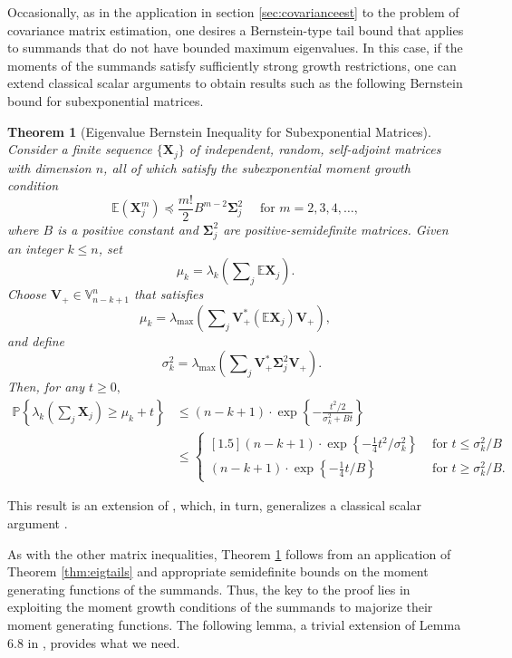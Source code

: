 \documentclass[11pt,letterpaper,twoside,reqno,nosumlimits]{amsart}
\renewcommand{\star}{*}
\newcommand{\mat}[1]{\ensuremath{\bm{#1}}} %
\newcommand{\E}{\ensuremath{\mathbb{E}}}
\newcommand{\Prob}[1]{\ensuremath{\mathbb{P}\left\{#1\right\}}}
\newcommand{\lambdamax}[1]{\ensuremath{\lambda_{\mathrm{max}}\left(#1\right)}}
\newcommand{\Isom}[2]{\ensuremath{\mathbb{V}_{#1}^{#2}}}
\newtheorem{thm}{Theorem}
\theoremstyle{remark}
\numberwithin{equation}{section}
\numberwithin{thm}{section}
\numberwithin{prop}{section}
\numberwithin{defn}{section}
\numberwithin{remark}{section}
\begin{document}
Occasionally, as in the application in section \ref{sec:covarianceest} to the problem of covariance matrix estimation, one desires a Bernstein-type tail bound that applies to summands that do not have bounded maximum eigenvalues. In this case, if the moments of the summands satisfy sufficiently strong growth restrictions, one can extend classical scalar arguments to obtain results such as the following Bernstein bound for subexponential matrices. 

\begin{thm}[Eigenvalue Bernstein Inequality for Subexponential Matrices]
Consider a finite sequence $\{\mat{X}_j\}$ of independent, random, self-adjoint matrices with dimension $n$, all of which satisfy the subexponential moment growth condition
\[
\E (\mat{X}_j^m) \preceq \frac{m!}{2} B^{m-2} \mat{\Sigma}_j^2 \quad \text{ for } m=2,3,4,\ldots,
\]
where $B$ is a positive constant and $\mat{\Sigma}_j^2$ are positive-semidefinite matrices. Given an integer $k \leq n$, set
\[
\mu_k = \lambda_k \left( \sum\nolimits_j \E \mat{X}_j \right).
\]
Choose $\mat{V}_+ \in \Isom{n-k+1}{n}$ that satisfies
\[
\mu_k = \lambdamax{ \sum\nolimits_j \mat{V}_+^\star (\E \mat{X}_j) \mat{V}_+ },
\]
and define
\[
 \quad \sigma_k^2 = \lambdamax{ \sum\nolimits_j \mat{V}_+^\star \mat{\Sigma}_j^2 \mat{V}_+ }.
\] 
Then, for any $t \geq 0,$
\begin{align}
\Prob{\lambda_k \left( \sum\nolimits_j \mat{X}_j \right) \geq \mu_k + t } & \leq (n-k+1) \cdot \exp\left\{ - \frac{t^2/2}{\sigma_k^2 + B t}\right\} \tag{i} \label{eqn:subexponentialbernstein} \\
 & \leq \begin{cases}[1.5]
         (n-k+1) \cdot \exp\left\{ -\tfrac{1}{4} t^2/\sigma_k^2\right\} & \text{ for } t \leq \sigma_k^2/B \\
	 (n-k+1) \cdot \exp\left\{ -\tfrac{1}{4} t/B\right\} & \text{ for } t \geq \sigma_k^2/B.
        \end{cases} \tag{ii} \label{eqn:splitsubexponentialbernstein}
\end{align}
\label{thm:subexponentialbernstein}
\end{thm}
 
This result is an extension of \cite[Theorem 6.2]{T10a}, which, in turn, generalizes a classical scalar argument \cite{DG99}.

As with the other matrix inequalities, Theorem \ref{thm:subexponentialbernstein} follows from an application of Theorem \ref{thm:eigtails} and appropriate semidefinite bounds on the moment generating functions of the summands. Thus, the key to the proof lies in exploiting the moment growth conditions of the summands to majorize their moment generating functions. The following lemma, a trivial extension of Lemma 6.8 in \cite{T10a}, provides what we need.
\end{document}
